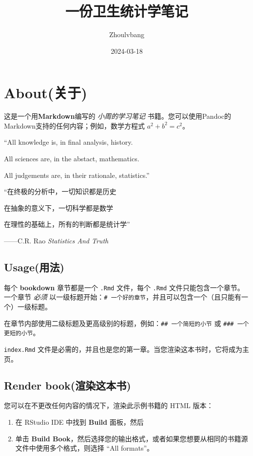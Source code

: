 \documentclass[
]{book}
\title{一份卫生统计学笔记}
\author{Zhoulvbang}
\date{2024-03-18}
\theoremstyle{definition}
\theoremstyle{definition}
\theoremstyle{definition}
\theoremstyle{definition}
\theoremstyle{remark}
\begin{document}
\maketitle

{
\setcounter{tocdepth}{1}
\tableofcontents
}
\hypertarget{aboutux5173ux4e8e}{%
\chapter{About(关于)}\label{aboutux5173ux4e8e}}

这是一个用\textbf{Markdown}编写的 \emph{小周的学习笔记} 书籍。您可以使用Pandoc的Markdown支持的任何内容；例如，数学方程式 \(a^2 + b^2 = c^2\)。

``All knowledge is, in final analysis, history.

All sciences are, in the abstact, mathematics.

All judgements are, in their rationale, statistics.''

``在终极的分析中，一切知识都是历史

在抽象的意义下，一切科学都是数学

在理性的基础上，所有的判断都是统计学''

------C.R. Rao \emph{Statistics And Truth}

\hypertarget{usageux7528ux6cd5}{%
\section{Usage(用法)}\label{usageux7528ux6cd5}}

每个 \textbf{bookdown} 章节都是一个 \texttt{.Rmd} 文件，每个 \texttt{.Rmd} 文件只能包含一个章节。一个章节 \emph{必须} 以一级标题开始：\texttt{\#\ 一个好的章节}，并且可以包含一个（且只能有一个）一级标题。

在章节内部使用二级标题及更高级别的标题，例如：\texttt{\#\#\ 一个简短的小节} 或 \texttt{\#\#\#\ 一个更短的小节}。

\texttt{index.Rmd} 文件是必需的，并且也是您的第一章。当您渲染这本书时，它将成为主页。

\hypertarget{render-bookux6e32ux67d3ux8fd9ux672cux4e66}{%
\section{Render book(渲染这本书)}\label{render-bookux6e32ux67d3ux8fd9ux672cux4e66}}

您可以在不更改任何内容的情况下，渲染此示例书籍的 HTML 版本：

\begin{enumerate}
\def\labelenumi{\arabic{enumi}.}
\item
  在 RStudio IDE 中找到 \textbf{Build} 面板，然后
\item
  单击 \textbf{Build Book}，然后选择您的输出格式，或者如果您想要从相同的书籍源文件中使用多个格式，则选择 ``All formats''。
\end{enumerate}
\end{document}
